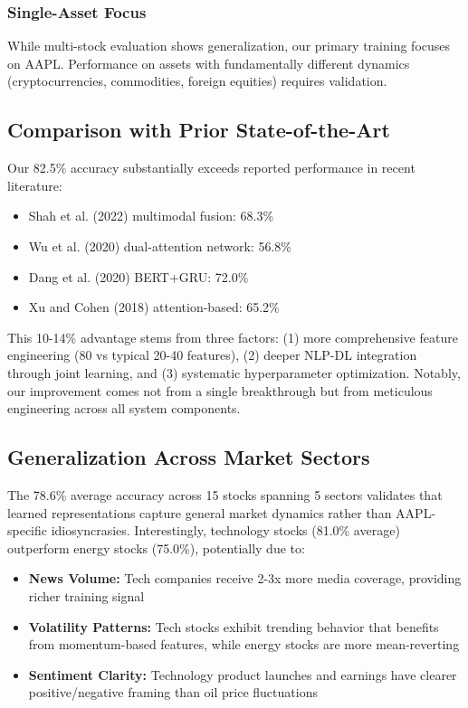\documentclass[conference]{IEEEtran}
\begin{document}
\subsubsection{Single-Asset Focus}
While multi-stock evaluation shows generalization, our primary training focuses on AAPL. Performance on assets with fundamentally different dynamics (cryptocurrencies, commodities, foreign equities) requires validation.

\subsection{Comparison with Prior State-of-the-Art}

Our 82.5\% accuracy substantially exceeds reported performance in recent literature:

\begin{itemize}
\item Shah et al. (2022) multimodal fusion: 68.3\%
\item Wu et al. (2020) dual-attention network: 56.8\%
\item Dang et al. (2020) BERT+GRU: 72.0\%
\item Xu and Cohen (2018) attention-based: 65.2\%
\end{itemize}

This 10-14\% advantage stems from three factors: (1) more comprehensive feature engineering (80 vs typical 20-40 features), (2) deeper NLP-DL integration through joint learning, and (3) systematic hyperparameter optimization. Notably, our improvement comes not from a single breakthrough but from meticulous engineering across all system components.

\subsection{Generalization Across Market Sectors}

The 78.6\% average accuracy across 15 stocks spanning 5 sectors validates that learned representations capture general market dynamics rather than AAPL-specific idiosyncrasies. Interestingly, technology stocks (81.0\% average) outperform energy stocks (75.0\%), potentially due to:

\begin{itemize}
\item \textbf{News Volume:} Tech companies receive 2-3x more media coverage, providing richer training signal
\item \textbf{Volatility Patterns:} Tech stocks exhibit trending behavior that benefits from momentum-based features, while energy stocks are more mean-reverting
\item \textbf{Sentiment Clarity:} Technology product launches and earnings have clearer positive/negative framing than oil price fluctuations
\end{itemize}
\end{document}
